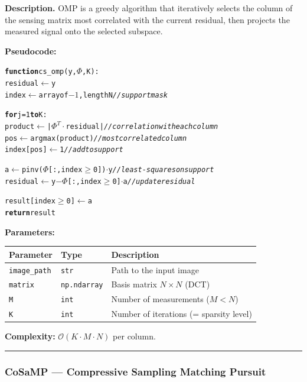 \documentclass[12pt,a4paper]{article}
\newcommand{\cs}[1]{\texttt{#1}}          %
\begin{document}
\textbf{Description.}  OMP is a greedy algorithm that iteratively selects the
column of the sensing matrix most correlated with the current residual, then
projects the measured signal onto the selected subspace.

\textbf{Pseudocode:}

\begin{alltt}
\textbf{function} cs\_omp(y, \(\Phi\), K):
    residual \(\leftarrow\) y
    index    \(\leftarrow\) array of \(-1\), length N        \textit{// support mask}

    \textbf{for} j = 1 \textbf{to} K:
        product    \(\leftarrow\) |\(\Phi^T \cdot\) residual|  \textit{// correlation with each column}
        pos        \(\leftarrow\) argmax(product)      \textit{// most correlated column}
        index[pos] \(\leftarrow\) 1                    \textit{// add to support}

        a        \(\leftarrow\) pinv(\(\Phi\)[:, index\(\geq\)0]) \(\cdot\) y  \textit{// least-squares on support}
        residual \(\leftarrow\) y \(-\) \(\Phi\)[:, index\(\geq\)0] \(\cdot\) a   \textit{// update residual}

    result[index\(\geq\)0] \(\leftarrow\) a
    \textbf{return} result
\end{alltt}

\textbf{Parameters:}

\begin{center}
\begin{tabular}{lll}
  \toprule
  Parameter & Type & Description \\
  \midrule
  \cs{image\_path} & \cs{str}          & Path to the input image \\
  \cs{matrix}      & \cs{np.ndarray}   & Basis matrix $N \times N$ (DCT) \\
  \cs{M}           & \cs{int}          & Number of measurements ($M < N$) \\
  \cs{K}           & \cs{int}          & Number of iterations (= sparsity level) \\
  \bottomrule
\end{tabular}
\end{center}

\textbf{Complexity:} $\mathcal{O}(K \cdot M \cdot N)$ per column.

\bigskip\hrule\bigskip

\subsubsection{CoSaMP --- Compressive Sampling Matching Pursuit}
\end{document}
